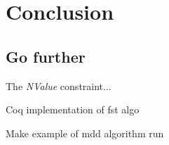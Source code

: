 \section{Conclusion}

\subsection{Go further}
The \textit{NValue} constraint...

Coq implementation of fst algo

Make example of mdd algorithm run